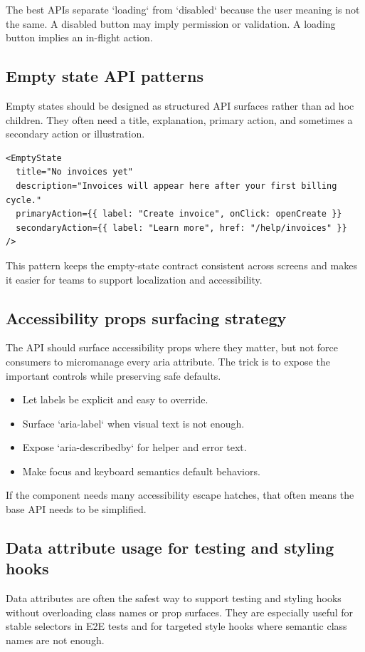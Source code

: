 The best APIs separate `loading` from `disabled` because the user meaning is not the same. A disabled button may imply permission or validation. A loading button implies an in-flight action.

\subsection{Empty state API patterns}
Empty states should be designed as structured API surfaces rather than ad hoc children. They often need a title, explanation, primary action, and sometimes a secondary action or illustration.

\begin{verbatim}
<EmptyState
  title="No invoices yet"
  description="Invoices will appear here after your first billing cycle."
  primaryAction={{ label: "Create invoice", onClick: openCreate }}
  secondaryAction={{ label: "Learn more", href: "/help/invoices" }}
/>
\end{verbatim}

This pattern keeps the empty-state contract consistent across screens and makes it easier for teams to support localization and accessibility.

\subsection{Accessibility props surfacing strategy}
The API should surface accessibility props where they matter, but not force consumers to micromanage every aria attribute. The trick is to expose the important controls while preserving safe defaults.

\begin{itemize}[leftmargin=*, itemsep=0.35em]
  \item Let labels be explicit and easy to override.
  \item Surface `aria-label` when visual text is not enough.
  \item Expose `aria-describedby` for helper and error text.
  \item Make focus and keyboard semantics default behaviors.
\end{itemize}

If the component needs many accessibility escape hatches, that often means the base API needs to be simplified.

\subsection{Data attribute usage for testing and styling hooks}
Data attributes are often the safest way to support testing and styling hooks without overloading class names or prop surfaces. They are especially useful for stable selectors in E2E tests and for targeted style hooks where semantic class names are not enough.

